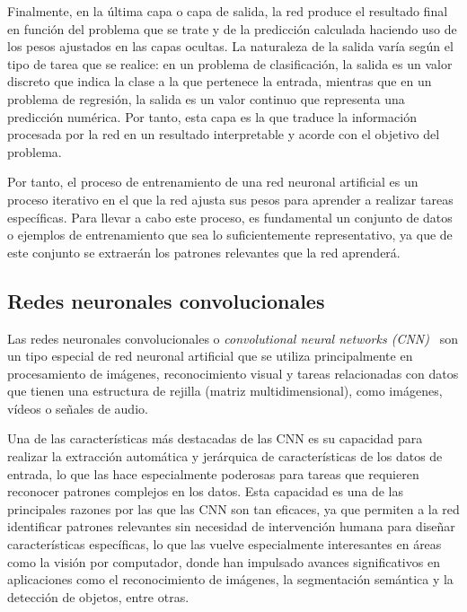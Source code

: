 Finalmente, en la última capa o capa de salida, la red produce el resultado final en función del problema que se trate y de la predicción calculada haciendo uso de los pesos ajustados en las capas ocultas. La naturaleza de la salida varía según el tipo de tarea que se realice: en un problema de clasificación, la salida es un valor discreto que indica la clase a la que pertenece la entrada, mientras que en un problema de regresión, la salida es un valor continuo que representa una predicción numérica. Por tanto, esta capa es la que traduce la información procesada por la red en un resultado interpretable y acorde con el objetivo del problema.

Por tanto, el proceso de entrenamiento de una red neuronal artificial es un proceso iterativo en el que la red ajusta sus pesos para aprender a realizar tareas específicas. Para llevar a cabo este proceso, es fundamental un conjunto de datos o ejemplos de entrenamiento que sea lo suficientemente representativo, ya que de este conjunto se extraerán los patrones relevantes que la red aprenderá.

\subsection{Redes neuronales convolucionales}\label{subsec:redes-neuronales-convolucionales}

Las redes neuronales convolucionales o \emph{convolutional neural networks (CNN)}~\cite{LeCun1989, LeCun1998} son un tipo especial de red neuronal artificial que se utiliza principalmente en procesamiento de imágenes, reconocimiento visual y tareas relacionadas con datos que tienen una estructura de rejilla (matriz multidimensional), como imágenes, vídeos o señales de audio.

Una de las características más destacadas de las CNN es su capacidad para realizar la extracción automática y jerárquica de características de los datos de entrada, lo que las hace especialmente poderosas para tareas que requieren reconocer patrones complejos en los datos. Esta capacidad es una de las principales razones por las que las CNN son tan eficaces, ya que permiten a la red identificar patrones relevantes sin necesidad de intervención humana para diseñar características específicas, lo que las vuelve especialmente interesantes en áreas como la visión por computador, donde han impulsado avances significativos en aplicaciones como el reconocimiento de imágenes, la segmentación semántica y la detección de objetos, entre otras.

